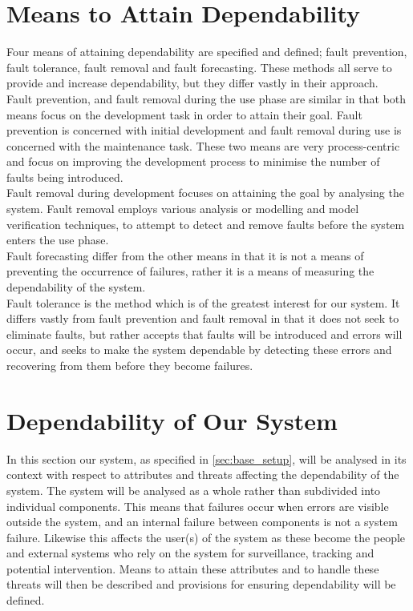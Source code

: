 \section{Means to Attain Dependability}\label{sec:depend_attain_depend}
Four means of attaining dependability are specified and defined; fault prevention, fault tolerance, fault removal and fault forecasting.
These methods all serve to provide and increase dependability, but they differ vastly in their approach.\\
Fault prevention, and fault removal during the use phase are similar in that both means focus on the development task in order to attain their goal.
Fault prevention is concerned with initial development and fault removal during use is concerned with the maintenance task.
These two means are very process-centric and focus on improving the development process to minimise the number of faults being introduced.\\
Fault removal during development focuses on attaining the goal by analysing the system.
Fault removal employs various analysis or modelling and model verification techniques, to attempt to detect and remove faults before the system enters the use phase.\\
Fault forecasting differ from the other means in that it is not a means of preventing the occurrence of failures,
rather it is a means of measuring the dependability of the system.\\
Fault tolerance is the method which is of the greatest interest for our system.
It differs vastly from fault prevention and fault removal in that it does not seek to eliminate faults,
but rather accepts that faults will be introduced and errors will occur,
and seeks to make the system dependable by detecting these errors and recovering from them before they become failures.

\section{Dependability of Our System}

In this section our system, as specified in \cref{sec:base_setup}, will be analysed in its context with respect to attributes and threats affecting the dependability of the system.
The system will be analysed as a whole rather than subdivided into individual components.
This means that failures occur when errors are visible outside the system, and an internal failure between components is not a system failure.
Likewise this affects the user(s) of the system as these become the people and external systems who rely on the system for surveillance, tracking and potential intervention.
Means to attain these attributes and to handle these threats will then be described and provisions for ensuring dependability will be defined.\\

